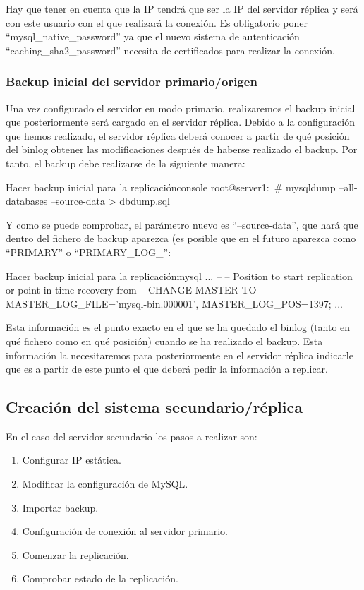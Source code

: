 Hay que tener en cuenta que la IP tendrá que ser la IP del servidor réplica y será con este usuario con el que realizará la conexión. Es obligatorio poner “mysql\_native\_password” ya que el nuevo sistema de autenticación “caching\_sha2\_password” necesita de certificados para realizar la conexión.


\subsubsection{Backup inicial del servidor primario/origen}
Una vez configurado el servidor en modo primario, realizaremos el backup inicial que posteriormente será cargado en el servidor réplica. Debido a la configuración que hemos realizado, el servidor réplica deberá conocer a partir de qué posición del binlog obtener las modificaciones después de haberse realizado el backup. Por tanto, el backup debe realizarse de la siguiente manera:

\begin{mycode}{Hacer backup inicial para la replicación}{console}{}
root@server1:~# mysqldump --all-databases --source-data > dbdump.sql
\end{mycode}

Y como se puede comprobar, el parámetro nuevo es “--source-data”, que hará que dentro del fichero de backup aparezca (es posible que en el futuro aparezca como “PRIMARY” o “PRIMARY\_LOG\_”:


\begin{mycode}{Hacer backup inicial para la replicación}{mysql}{{\small }}
...
--
-- Position to start replication or point-in-time recovery from
--
CHANGE MASTER TO MASTER_LOG_FILE='mysql-bin.000001', MASTER_LOG_POS=1397;
...
\end{mycode}

Esta información es el punto exacto en el que se ha quedado el binlog (tanto en qué fichero como en qué posición) cuando se ha realizado el backup. Esta información la necesitaremos para posteriormente en el servidor réplica indicarle que es a partir de este punto el que deberá pedir la información a replicar.


\subsection{Creación del sistema secundario/réplica}
En el caso del servidor secundario los pasos a realizar son:

\begin{enumerate}
    \item Configurar IP estática.
    \item Modificar la configuración de MySQL.
    \item Importar backup.
    \item Configuración de conexión  al servidor primario.
    \item Comenzar la replicación.
    \item Comprobar estado de la replicación.
\end{enumerate}



